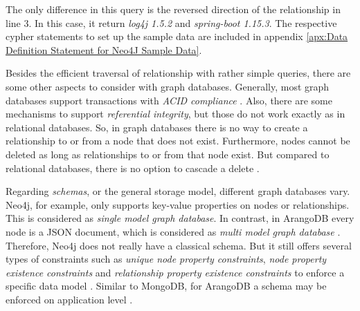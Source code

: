 The only difference in this query is the reversed direction of the relationship in line 3. In this case, it return \emph{log4j 1.5.2} and \emph{spring-boot 1.15.3}. The respective cypher statements to set up the sample data are included in appendix \ref{apx:Data Definition Statement for Neo4J Sample Data}.\par
Besides the efficient traversal of relationship with rather simple queries, there are some other aspects to consider with graph databases. Generally, most graph databases support transactions with \emph{ACID compliance} \cite{neo4jtransactions, arangodbtransactions}. Also, there are some mechanisms to support \emph{referential integrity}, but those do not work exactly as in relational databases. So, in graph databases there is no way to create a relationship to or from a node that does not exist. Furthermore, nodes cannot be deleted as long as relationships to or from that node exist. But compared to relational databases, there is no option to cascade a delete \cite{neo4jdelete}.\par
Regarding \emph{schemas}, or the general storage model, different graph databases vary. Neo4j, for example, only supports key-value properties on nodes or relationships. This is considered as \emph{single model graph database}. In contrast, in ArangoDB every node is a JSON document, which is considered as \emph{multi model graph database} \cite{arangodbdocuments}. Therefore, Neo4j does not really have a classical schema. But it still offers several types of constraints such as \emph{unique node property constraints}, \emph{node property existence constraints} and \emph{relationship property existence constraints} to enforce a specific data model \cite{neo4jconstraints}. Similar to MongoDB, for ArangoDB a schema may be enforced on application level \cite{arangodbschema}.

